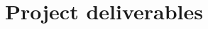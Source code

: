 \documentclass[11pt,fleqn,twoside]{article}
\begin{document}
\section{Project deliverables}


%
\end{document}
